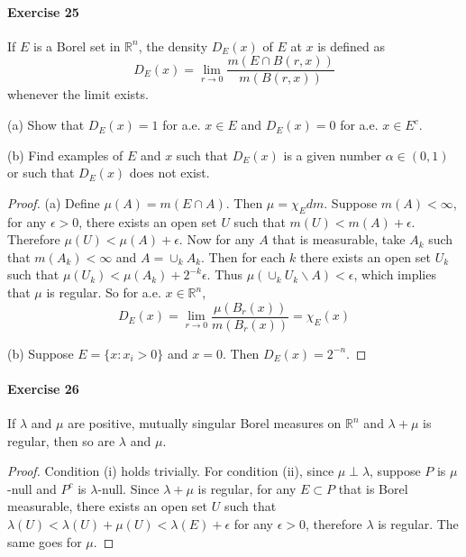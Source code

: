 \paragraph*{Exercise 25}
If $E$ is a Borel set in $\mathbb{R}^n$, the density $D_E(x)$ of $E$ at $x$ is defined as
$$
D_E(x)=\lim_{r\to0}\dfrac{m(E\cap B(r,x))}{m(B(r,x))}
$$
whenever the limit exists.
\par (a) Show that $D_E(x)=1$ for a.e. $x\in E$ and $D_E(x)=0$ for a.e. $x\in E^c$.
\par (b) Find examples of $E$ and $x$ such that $D_E(x)$ is a given number $\alpha\in(0,1)$ or such that $D_E(x)$ does not exist.
\begin{proof}
    (a) Define $\mu(A)=m(E\cap A)$. Then $\mu=\chi_Edm$. Suppose $m(A)<\infty$, for any $\epsilon>0$, there exists an open set $U$ such that $m(U)<m(A)+\epsilon$. Therefore $\mu(U)<\mu(A)+\epsilon$. Now for any $A$ that is measurable, take $A_k$ such that $m(A_k)<\infty$ and $A=\cup_kA_k$. Then for each $k$ there exists an open set $U_k$ such that $\mu(U_k)<\mu(A_k)+2^{-k}\epsilon$. Thus $\mu(\cup_kU_k\backslash A)<\epsilon$, which implies that $\mu$ is regular. So for a.e. $x\in\mathbb{R}^n$,
    $$
    D_E(x)=\lim_{r\to 0}\dfrac{\mu(B_r(x))}{m(B_r(x))}=\chi_E(x)
    $$
    \par (b) Suppose $E=\{x:x_i>0\}$ and $x=0$. Then $D_E(x)=2^{-n}$.
\end{proof}
\paragraph*{Exercise 26}
If $\lambda$ and $\mu$ are positive, mutually singular Borel measures on $\mathbb{R}^n$ and $\lambda+\mu$ is regular, then so are $\lambda$ and $\mu$.
\begin{proof}
    Condition (i) holds trivially. For condition (ii), since $\mu\perp\lambda$, suppose $P$ is $\mu$-null and $P^c$ is $\lambda$-null. Since $\lambda+\mu$ is regular, for any $E\subset P$ that is Borel measurable, there exists an open set $U$ such that $\lambda(U)<\lambda(U)+\mu(U)<\lambda(E)+\epsilon$ for any $\epsilon>0$, therefore $\lambda$ is regular. The same goes for $\mu$.
\end{proof}
